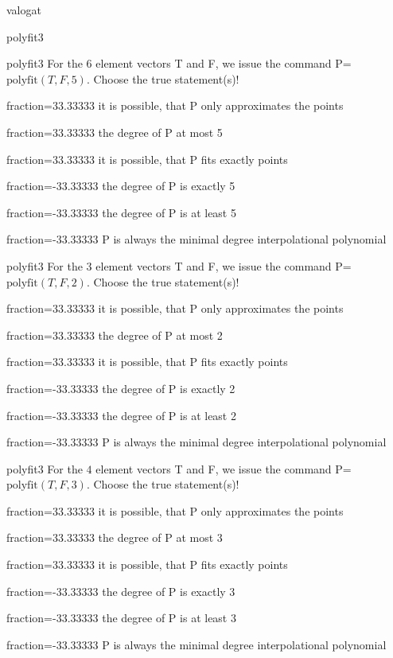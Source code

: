 \documentclass[12pt]{article}
\begin{document}
\begin{quiz}{valogat}
\begin{multi}[single=false]{polyfit3}
\end{multi}
\begin{multi}[single=false]{polyfit3}
For the $6$ element vectors T and F, we issue the command P=$\mathrm{polyfit}(T,F,5)$.
Choose the true statement(s)!
\item[fraction=33.33333] it is possible, that P only approximates the points
\item[fraction=33.33333] the degree of P at most 5
\item[fraction=33.33333] it is possible, that P fits exactly points
\item[fraction=-33.33333]  the degree of P is exactly 5
\item[fraction=-33.33333]  the degree of P is at least 5
\item[fraction=-33.33333]  P is always the minimal degree interpolational polynomial
\end{multi}
\begin{multi}[single=false]{polyfit3}
For the $3$ element vectors T and F, we issue the command P=$\mathrm{polyfit}(T,F,2)$.
Choose the true statement(s)!
\item[fraction=33.33333] it is possible, that P only approximates the points
\item[fraction=33.33333] the degree of P at most 2
\item[fraction=33.33333] it is possible, that P fits exactly points
\item[fraction=-33.33333]  the degree of P is exactly 2
\item[fraction=-33.33333]  the degree of P is at least 2
\item[fraction=-33.33333]  P is always the minimal degree interpolational polynomial
\end{multi}
\begin{multi}[single=false]{polyfit3}
For the $4$ element vectors T and F, we issue the command P=$\mathrm{polyfit}(T,F,3)$.
Choose the true statement(s)!
\item[fraction=33.33333] it is possible, that P only approximates the points
\item[fraction=33.33333] the degree of P at most 3
\item[fraction=33.33333] it is possible, that P fits exactly points
\item[fraction=-33.33333]  the degree of P is exactly 3
\item[fraction=-33.33333]  the degree of P is at least 3
\item[fraction=-33.33333]  P is always the minimal degree interpolational polynomial
\end{multi}
\end{quiz}
\end{document}
